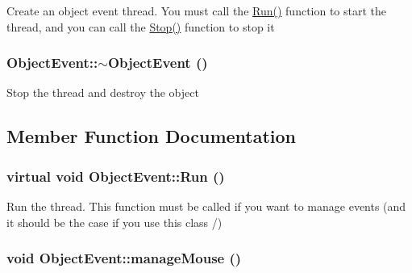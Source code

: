 Create an object event thread. You must call the \hyperlink{classObjectEvent_5c69864ed57f567ef9cb85fae234726b}{Run()} function to start the thread, and you can call the \hyperlink{classObjectEvent_fc881fdc9cf9352370716c9240eecd4f}{Stop()} function to stop it \hypertarget{classObjectEvent_d934287161965254cb6109828987724d}{
\subsubsection[$\sim$ObjectEvent]{\setlength{\rightskip}{0pt plus 5cm}ObjectEvent::$\sim$ObjectEvent ()}}
\label{classObjectEvent_d934287161965254cb6109828987724d}




Stop the thread and destroy the object 

\subsection{Member Function Documentation}
\hypertarget{classObjectEvent_5c69864ed57f567ef9cb85fae234726b}{
\subsubsection[Run]{\setlength{\rightskip}{0pt plus 5cm}virtual void ObjectEvent::Run ()}}
\label{classObjectEvent_5c69864ed57f567ef9cb85fae234726b}




Run the thread. This function must be called if you want to manage events (and it should be the case if you use this class /) \hypertarget{classObjectEvent_c1fb2fa4a3def96157510f0828c598ac}{
\subsubsection[manageMouse]{\setlength{\rightskip}{0pt plus 5cm}void ObjectEvent::manageMouse ()}}
\label{classObjectEvent_c1fb2fa4a3def96157510f0828c598ac}




